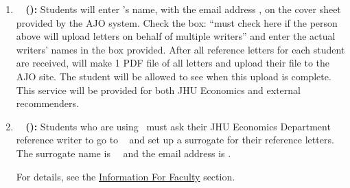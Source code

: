 \documentclass{\econtex}
\begin{document}
\begin{enumerate}
\begin{itemize}
  \item Recommenders who are not Department of Economics full-time faculty and who do NOT have their own
    login ID at \EJM~will need to have an account created for them (the account is created automatically the first time a student identifies the recommender by giving \EJM~the recommender's email address), then they must upload their letters themselves.\footnote{They follow the same steps that the
      staff completes in the bullet point about JHU faculty.  They
      log in, they upload their letter, they indicate that it's for, e.g.,
      \texttt{colleen.carey@jhu.edu}, and then they select all employers and tick the box for all
      future employers.}
    New \EJM~security measures prevent us from uploading letters on behalf of people
    who are not JHU faculty, including recently departed JHU faculty who still have an official JHU email (the letter writer must write from their new institution).  The student must communicate this information to  the recommender.

  \end{itemize}

  
\item \textbf{\AJO ~ (\AJOLink):}
  Students will enter {\JMStaffName}'s name, with the email address \jmstaffemail, on the cover sheet provided by the AJO system. Check the box: ``must check here if the person above will upload letters on behalf of multiple writers'' and enter the actual writers' names in the box provided. After all reference letters for each student are received, {\JMStaffName} will make 1 PDF file of all letters and upload their file to the AJO site. The student will be allowed to see when this upload is complete. This service will be provided for both JHU Economics and external recommenders.

\item \textbf{\AEA ~ (\AEALink):}
  Students who are using \AEA~must ask their JHU Economics Department reference writer to go to \AEARecLink~ and set up a surrogate for their reference letters. The surrogate name is {\JMStaffName}~{\JMStaffNameLast}~and the email address is \jmstaffemail. %

  For details, see the \href{\pageurl/RecLetters#information-for-faculty}{Information For Faculty} section.
  

\end{enumerate}
\end{document}
